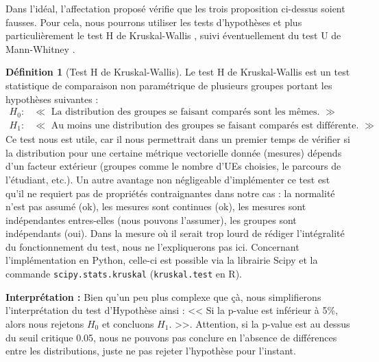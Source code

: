 \documentclass{rapport}
\theoremstyle{definition}
\newtheorem{definition}{Définition}
\theoremstyle{remark}
\theoremstyle{plain}
\theoremstyle{definition}
\theoremstyle{remark}
\begin{document}
Dans l'idéal, l'affectation proposé vérifie que les trois proposition ci-dessus soient fausses. Pour cela, nous pourrons utiliser les tests d'hypothèses et plus particulièrement le test H de Kruskal-Wallis \cite{Kruskal1952}, suivi éventuellement du test U de Mann-Whitney \cite{Whitney1947}.
\begin{definition}[Test H de Kruskal-Wallis]
    Le test H de Kruskal-Wallis est un test statistique de comparaison non paramétrique de plusieurs groupes portant les hypothèses suivantes :
    $$
    \begin{matrix}
        H_0 : & \ll\text{ La distribution des groupes se faisant comparés sont les mêmes. } \gg\\
        H_1 : & \ll\text{ Au moins une distribution des groupes se faisant comparés est différente. }\gg
    \end{matrix}
    $$
    Ce test nous est utile, car il nous permettrait dans un premier temps de vérifier si la distribution pour une certaine métrique vectorielle donnée (mesures) dépends d'un facteur extérieur (groupes comme le nombre d'UEs choisies, le parcours de l'étudiant, etc.).
    Un autre avantage non négligeable d'implémenter ce test est qu'il ne requiert pas de propriétés contraignantes dans notre cas : la normalité n'est pas assumé (ok), les mesures sont continues (ok), les mesures sont indépendantes entres-elles (nous pouvons l'assumer), les groupes sont indépendants (oui).
    Dans la mesure où il serait trop lourd de rédiger l'intégralité du fonctionnement du test, nous ne l'expliquerons pas ici. Concernant l'implémentation en Python, celle-ci est possible via la librairie Scipy et la commande \texttt{scipy.stats.kruskal} (\texttt{kruskal.test} en R).

    \textbf{Interprétation :} Bien qu'un peu plus complexe que çà, nous simplifierons l'interprétation du test d'Hypothèse ainsi : << Si la p-value est inférieur à 5\%, alors nous rejetons $H_0$ et concluons $H_1$. >>. Attention, si la p-value est au dessus du seuil critique 0.05, nous ne pouvons pas conclure en l'absence de différences entre les distributions, juste ne pas rejeter l'hypothèse pour l'instant.
\end{definition}
\end{document}
